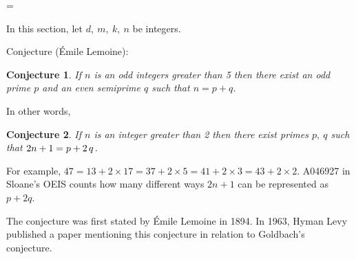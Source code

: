 \documentclass[12pt]{article}
\newtheorem{conjecture}{Conjecture}
\begin{document}
\parskip =\baselineskip
	
\def\natdiv#1#2{{#1}\mathrel{|}{#2}}
	
\begin{cnl}
		
		
\bigskip
		

		
In this section, let $d,\ m,\ k,\ n$ be integers.
		






\begin{remark}
Conjecture (\'Emile Lemoine): 
\end{remark}

\begin{conjecture}
If $n$ is an odd integers greater than 5 then there exist an odd prime $p$ and an even semiprime $q$ such that $n=p+q$. 
\end{conjecture}

\begin{remark}
In other words, 
\end{remark}

\begin{conjecture}
If $n$ is an integer greater than 2 then there exist primes $p,\ q$ such that $2n + 1 = p + 2\,q$. 
\end{conjecture}

\begin{remark}

For example, $47 = 13 + 2 \times 17 = 37 + 2 \times 5 = 41 + 2 \times 3 = 43 + 2 \times 2$. A046927 in Sloane's OEIS counts how many different ways $2n + 1$ can be represented as $p + 2q$.

The conjecture was first stated by \'Emile Lemoine in 1894. In 1963, Hyman Levy published a paper mentioning this conjecture in relation to Goldbach's conjecture.
\end{remark}

\end{cnl}
\end{document}
